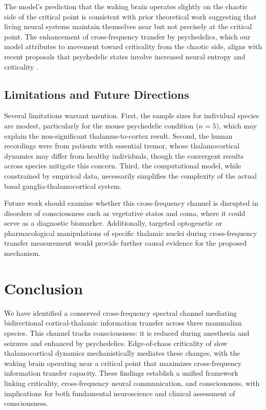 \documentclass[12pt]{article}
\begin{document}
The model's prediction that the waking brain operates slightly on the chaotic side of the critical point is consistent with prior theoretical work suggesting that living neural systems maintain themselves near but not precisely at the critical point. The enhancement of cross-frequency transfer by psychedelics, which our model attributes to movement toward criticality from the chaotic side, aligns with recent proposals that psychedelic states involve increased neural entropy and criticality \citep{carhart2016neural}.

\subsection{Limitations and Future Directions}

Several limitations warrant mention. First, the sample sizes for individual species are modest, particularly for the mouse psychedelic condition ($n = 5$), which may explain the non-significant thalamus-to-cortex result. Second, the human recordings were from patients with essential tremor, whose thalamocortical dynamics may differ from healthy individuals, though the convergent results across species mitigate this concern. Third, the computational model, while constrained by empirical data, necessarily simplifies the complexity of the actual basal ganglia-thalamocortical system.

Future work should examine whether this cross-frequency channel is disrupted in disorders of consciousness such as vegetative states and coma, where it could serve as a diagnostic biomarker. Additionally, targeted optogenetic or pharmacological manipulations of specific thalamic nuclei during cross-frequency transfer measurement would provide further causal evidence for the proposed mechanism.

\section{Conclusion}

We have identified a conserved cross-frequency spectral channel mediating bidirectional cortical-thalamic information transfer across three mammalian species. This channel tracks consciousness: it is reduced during anesthesia and seizures and enhanced by psychedelics. Edge-of-chaos criticality of slow thalamocortical dynamics mechanistically mediates these changes, with the waking brain operating near a critical point that maximizes cross-frequency information transfer capacity. These findings establish a unified framework linking criticality, cross-frequency neural communication, and consciousness, with implications for both fundamental neuroscience and clinical assessment of consciousness.



\end{document}
